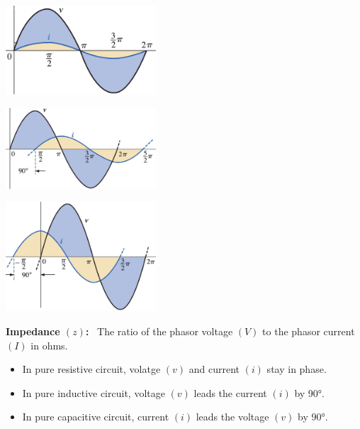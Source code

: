 \documentclass[12pt]{article}
\begin{document}
\vspace{2ex}
\begin{minipage}[t]{0.33\textwidth}
   \includegraphics[width=5.6cm]{figures/Pure Resistive.JPG}
\end{minipage}
\begin{minipage}[t]{0.33\textwidth}
   \includegraphics[width=5.6cm]{figures/Pure Inductive.JPG}
\end{minipage}
\begin{minipage}[t]{0.33\textwidth}
   \includegraphics[width=5.6cm]{figures/Pure Capacitive.JPG}
\end{minipage}


\vspace{-0.5\baselineskip}


\textbf{Impedance $(z)$:} \ The ratio of the phasor voltage $(V)$ to the phasor current $(I)$ in ohms.

\begin{itemize}
   \item In pure resistive circuit, volatge $(v)$ and current $(i)$ stay in phase.\\[-5ex]
   \item In pure inductive circuit, voltage $(v)$ leads the current $(i)$ by 90°.\\[-5ex]
   \item In pure capacitive circuit, current $(i)$ leads the voltage $(v)$ by 90°.
\end{itemize}
\end{document}
